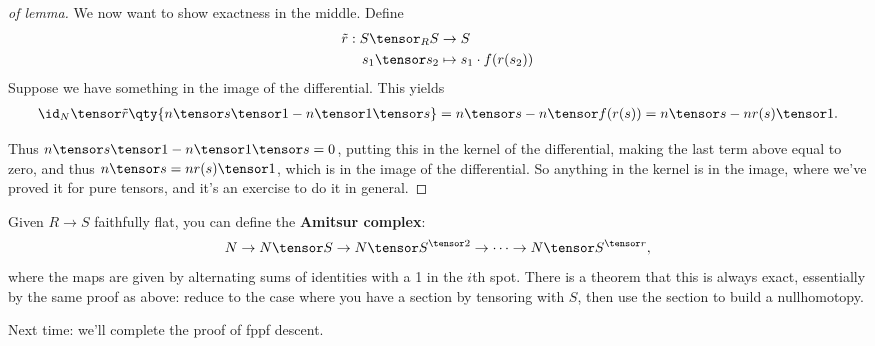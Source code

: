 \begin{proof}[of lemma]
We now want to show exactness in the middle. Define
\begin{align*}
\tilde r: S\tensor_R S &\to S \\
s_1 \tensor s_2 &\mapsto s_1 \cdot f(r(s_2))
\end{align*} Suppose we have something in the image of the differential.
This yields
\begin{align*}  
\id_N \tensor \tilde r \qty{n\tensor s\tensor 1 - n\tensor 1 \tensor s}
= n\tensor s - n\tensor f(r(s))
= n\tensor s - nr(s) \tensor 1
.\end{align*}

Thus \(n\tensor s\tensor 1 - n\tensor 1\tensor s = 0\), putting this in
the kernel of the differential, making the last term above equal to
zero, and thus \(n\tensor s = n r(s) \tensor 1\), which is in the image
of the differential. So anything in the kernel is in the image, where
we've proved it for pure tensors, and it's an exercise to do it in
general.

\end{proof}

\begin{remark}

Given \(R\to S\) faithfully flat, you can define the \textbf{Amitsur
complex}:
\begin{align*}  
N \to N\tensor S \to N\tensor S^{\tensor 2} \to \cdots \to N\tensor S^{\tensor r}
,\end{align*} where the maps are given by alternating sums of identities
with a 1 in the \(i\)th spot. There is a theorem that this is always
exact, essentially by the same proof as above: reduce to the case where
you have a section by tensoring with \(S\), then use the section to
build a nullhomotopy.

\end{remark}

Next time: we'll complete the proof of fppf descent.

\cleardoublepage

\renewcommand{\listtheoremname}{}
\listoftheorems[ignoreall,show={definition}, numwidth=3.5em]
\cleardoublepage

\renewcommand{\listtheoremname}{}
\listoftheorems[ignoreall,show={theorem,proposition}, numwidth=3.5em]
\cleardoublepage

\renewcommand{\listtheoremname}{}
\listoftheorems[ignoreall,show={exercise}, numwidth=3.5em]
\cleardoublepage

\listoffigures
\cleardoublepage


\printbibliography[title=Bibliography]




